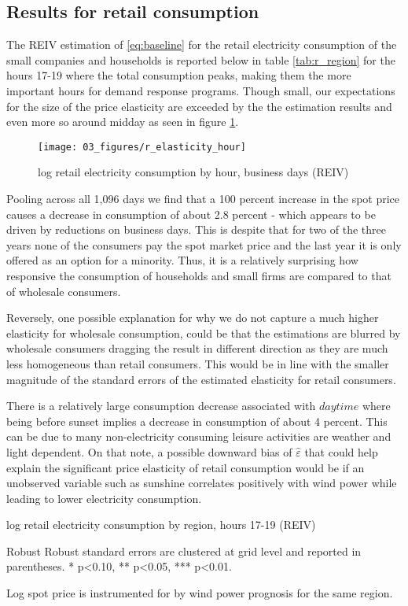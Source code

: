 \subsection{Results for retail consumption}
\label{subsec:r_households}
The REIV estimation of \eqref{eq:baseline} for the retail electricity consumption of the small companies and households is reported below in table \ref{tab:r_region} for the hours 17-19 where the total consumption peaks, making them the more important hours for demand response programs. Though small, our expectations for the size of the price elasticity are exceeded by the the estimation results and even more so around midday as seen in figure \ref{fig:r_elasticity_hour}.
\begin{figure}[H]
  \centering
  \caption{log retail electricity consumption by hour, business days (REIV)}
    \label{fig:r_elasticity_hour}
  \texttt{[image: 03\_figures/r\_elasticity\_hour]}
\end{figure}
Pooling across all 1,096 days we find that a 100 percent increase in the spot price causes a decrease in consumption of about 2.8 percent - which appears to be driven by reductions on business days. This is despite that for two of the three years none of the consumers pay the spot market price and the last year it is only offered as an option for a minority. Thus, it is a relatively surprising how responsive the consumption of households and small firms are compared to that of wholesale consumers.
\par
Reversely, one possible explanation for why we do not capture a much higher elasticity for wholesale consumption, could be that the estimations are blurred by wholesale consumers dragging the result in different direction as they are much less homogeneous than retail consumers. This would be in line with the smaller magnitude of the standard errors of the estimated elasticity for retail consumers.
\bigskip\par
There is a relatively large consumption decrease associated with $daytime$ where being before sunset implies a decrease in consumption of about 4 percent. This can be due to many non-electricity consuming leisure activities are weather and light dependent. On that note, a possible downward bias of $\widehat{\varepsilon}$ that could help explain the significant price elasticity of retail consumption would be if an unobserved variable such as sunshine correlates positively with wind power while leading to lower electricity consumption.
\begin{table}[H]
\begin{threeparttable}
  \centering
  \caption{log retail electricity consumption by region, hours 17-19 (REIV)}
  \label{tab:r_region}
  \footnotesize
    
    \begin{tablenotes}
    \item Robust Robust standard errors are clustered at grid level and reported in parentheses. * p<0.10, ** p<0.05, *** p<0.01.
    \item Log spot price is instrumented for by wind power prognosis for the same region.
  \end{tablenotes}
\end{threeparttable}
\end{table}
